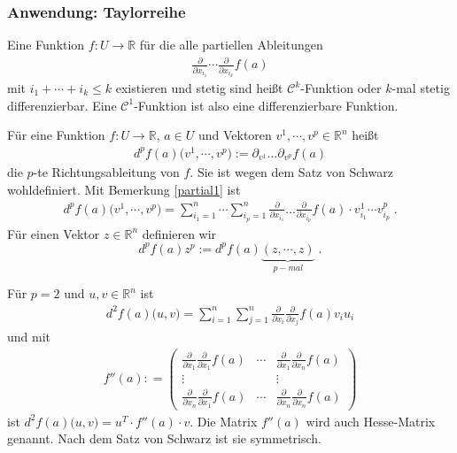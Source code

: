 \subsubsection*{Anwendung: Taylorreihe} 


\begin{Definition}
Eine  Funktion  $f: U \to \mathbb{R}$ für die alle partiellen Ableitungen 
\begin{align*}
 \frac{\partial}{\partial x_{i_1}} \cdots   \frac{\partial}{\partial x_{i_k}} f(a)
\end{align*}
mit $i_1 + \cdots + i_k \leq k$ existieren und stetig sind heißt $\mathcal{C}^k$-Funktion oder $k$-mal stetig differenzierbar. Eine 
$\mathcal{C}^1$-Funktion ist also eine differenzierbare Funktion.
\end{Definition}

\begin{Definition}
Für  eine Funktion  $f: U \to \mathbb{R}$, $a \in U$ und Vektoren $v^1, \cdots , v^p \in \mathbb{R}^n$ heißt 
\begin{align*}
d^pf(a) \bigl(v^1, \cdots , v^p  ) := \partial_{v^1} \hdots \partial_{v^p} f(a)
\end{align*}
die $p$-te Richtungsableitung von $f$. Sie ist wegen dem Satz von Schwarz wohldefiniert.
Mit Bemerkung \ref{partial1} ist
\begin{align*}
d^pf(a) \bigl(v^1, \cdots , v^p  ) = \sum_{i_1 = 1}^n \cdots \sum_{i_p = 1}^n  \frac{\partial}{\partial x_{i_1}} \hdots \frac{\partial}{\partial x_{i_p}} f(a) \cdot v^1_{i_1} \cdots v^p_{i_p} \; .
\end{align*}
Für einen Vektor $z \in \mathbb{R}^n$ definieren wir $$d^pf(a) z^p := d^pf(a) \underbrace{(z, \cdots , z)}_{p-mal} \;.$$

\end{Definition}



\begin{Bemerkung}
Für $p = 2$ und $u,v \in \mathbb{R}^n$ ist
\begin{align*}
d^2f(a) \bigl(u , v ) = \sum_{i = 1}^n \sum_{j = 1}^n \frac{\partial}{\partial x_{i}}  \frac{\partial}{\partial x_{j}} f(a) v_{i}  u_{i} 
\end{align*}
und mit 
\begin{align*}
f''(a) : = \begin{pmatrix}  \frac{\partial}{\partial x_{1}} \frac{\partial}{\partial x_{1}} f(a)   &  \cdots &  \frac{\partial}{\partial x_{1}} \frac{\partial}{\partial x_{n}} f(a) \\
\vdots & & \vdots  \\
 \frac{\partial}{\partial x_{n}} \frac{\partial}{\partial x_{1}} f(a)   &  \cdots &  \frac{\partial}{\partial x_{n}} \frac{\partial}{\partial x_{n}} f(a)
\end{pmatrix} 
\end{align*}
ist $d^2f(a) \bigl(u , v ) = u^T  \cdot f''(a) \cdot v$. Die Matrix $f''(a)$ wird auch Hesse-Matrix genannt. Nach dem Satz von Schwarz ist sie symmetrisch.
\end{Bemerkung}


